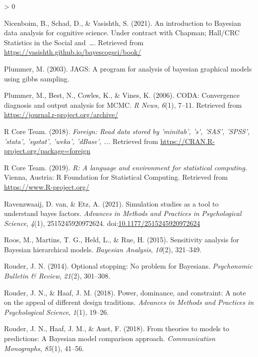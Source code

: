 \documentclass[
  english,
  doc,floatsintext]{apa6}
\newlength{\cslhangindent}
\newenvironment{CSLReferences}[2] %
 {%
  \setlength{\parindent}{0pt}
  \ifodd #1 \everypar{\setlength{\hangindent}{\cslhangindent}}\ignorespaces\fi
  \ifnum #2 > 0
  \setlength{\parskip}{#2\baselineskip}
  \fi
 }%
 {}
\begin{document}
\begin{CSLReferences}{1}{0}
\leavevmode\hypertarget{ref-nicenboim2021introduction}{}%
Nicenboim, B., Schad, D., \& Vasishth, S. (2021). An introduction to {Bayesian} data analysis for cognitive science. Under contract with Chapman; Hall/CRC Statistics in the Social and~\ldots. Retrieved from \url{https://vasishth.github.io/bayescogsci/book/}

\leavevmode\hypertarget{ref-Plummer03jagsa}{}%
Plummer, M. (2003). JAGS: A program for analysis of bayesian graphical models using gibbs sampling.

\leavevmode\hypertarget{ref-R-coda}{}%
Plummer, M., Best, N., Cowles, K., \& Vines, K. (2006). CODA: Convergence diagnosis and output analysis for MCMC. \emph{R News}, \emph{6}(1), 7--11. Retrieved from \url{https://journal.r-project.org/archive/}

\leavevmode\hypertarget{ref-R-foreign}{}%
R Core Team. (2018). \emph{Foreign: Read data stored by 'minitab', 's', 'SAS', 'SPSS', 'stata', 'systat', 'weka', 'dBase', ...} Retrieved from \url{https://CRAN.R-project.org/package=foreign}

\leavevmode\hypertarget{ref-R-base}{}%
R Core Team. (2019). \emph{R: A language and environment for statistical computing}. Vienna, Austria: R Foundation for Statistical Computing. Retrieved from \url{https://www.R-project.org/}

\leavevmode\hypertarget{ref-van2021simulation}{}%
Ravenzwaaij, D. van, \& Etz, A. (2021). Simulation studies as a tool to understand bayes factors. \emph{Advances in Methods and Practices in Psychological Science}, \emph{4}(1), 2515245920972624. doi:\href{https://doi.org/10.1177/2515245920972624}{10.1177/2515245920972624}

\leavevmode\hypertarget{ref-roos2015sensitivity}{}%
Roos, M., Martins, T. G., Held, L., \& Rue, H. (2015). Sensitivity analysis for {Bayesian} hierarchical models. \emph{Bayesian Analysis}, \emph{10}(2), 321--349.

\leavevmode\hypertarget{ref-rouder2014optional}{}%
Rouder, J. N. (2014). Optional stopping: No problem for {Bayesians}. \emph{Psychonomic Bulletin \& Review}, \emph{21}(2), 301--308.

\leavevmode\hypertarget{ref-rouder2018power}{}%
Rouder, J. N., \& Haaf, J. M. (2018). Power, dominance, and constraint: A note on the appeal of different design traditions. \emph{Advances in Methods and Practices in Psychological Science}, \emph{1}(1), 19--26.

\leavevmode\hypertarget{ref-rouder2018theories}{}%
Rouder, J. N., Haaf, J. M., \& Aust, F. (2018). From theories to models to predictions: A {Bayesian} model comparison approach. \emph{Communication Monographs}, \emph{85}(1), 41--56.


\end{CSLReferences}
\end{document}
